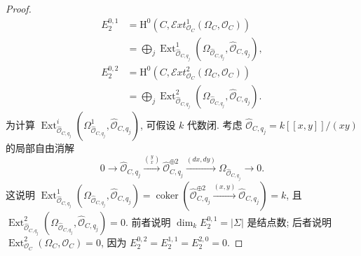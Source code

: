 \begin{proof}
\[
\begin{aligned}
E_2^{0,1}&=\mathrm H^0(C,\mathcal E xt^1_{\mathcal O_C}(\Omega_C,\mathcal O_C))\\
&=\bigoplus_j\operatorname{Ext}^1_{\widehat{\mathcal O}_{C,q_j}}(\Omega_{\widehat{\mathcal O}_{C,q_j}},\widehat{\mathcal O}_{C,q_j}),\\
E_2^{0,2}&=\mathrm H^0(C,\mathcal E xt^2_{\mathcal O_C}(\Omega_C,\mathcal O_C))\\
&=\bigoplus_j\operatorname{Ext}^2_{\widehat{\mathcal O}_{C,q_j}}(\Omega_{\widehat{\mathcal O}_{C,q_j}},\widehat{\mathcal O}_{C,q_j}).
\end{aligned}
\]
为计算 $\operatorname{Ext}^i_{\widehat{\mathcal O}_{C,\allowbreak q_j}}(\Omega^1_{\widehat{\mathcal O}_{C,\allowbreak q_j}},\allowbreak \widehat{\mathcal O}_{C,\allowbreak q_j})$, 可假设 $k$ 代数闭. 考虑 $\widehat{\mathcal O}_{C,\allowbreak q_j}=k[[x,\allowbreak y]]/(xy)$ 的局部自由消解
\[
0\to\widehat{\mathcal O}_{C,q_j}\xrightarrow{\binom{y}{x}}\widehat{\mathcal O}_{C,q_j}^{\oplus2}\xrightarrow{(dx,dy)}\Omega_{\widehat{\mathcal O}_{C,q_j}}\to0.
\]
这说明 $\operatorname{Ext}^1_{\widehat{\mathcal O}_{C,\allowbreak q_j}}(\Omega_{\widehat{\mathcal O}_{C,\allowbreak q_j}},\allowbreak \widehat{\mathcal O}_{C,\allowbreak q_j})=\operatorname{coker}(\widehat{\mathcal O}_{C,\allowbreak q_j}^{\oplus2}\xrightarrow{(x,\allowbreak y)}\widehat{\mathcal O}_{C,\allowbreak q_j})=k$, 且 $\operatorname{Ext}^2_{\widehat{\mathcal O}_{C,\allowbreak q_j}}(\Omega_{\widehat{\mathcal O}_{C,\allowbreak q_j}},\allowbreak \widehat{\mathcal O}_{C,\allowbreak q_j})=0$. 前者说明 $\dim_k E_2^{0,\allowbreak 1}=|\Sigma|$ 是结点数; 后者说明 $\operatorname{Ext}^2_{\mathcal O_C}(\Omega_C,\allowbreak \mathcal O_C)=0$, 因为 $E_2^{0,\allowbreak 2}=E_2^{1,\allowbreak 1}=E_2^{2,\allowbreak 0}=0$.


\end{proof}
